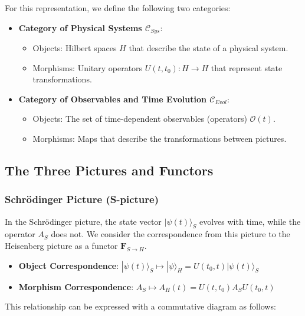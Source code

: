 \documentclass[uplatex,a4j,12pt,dvipdfmx]{jsarticle}
\begin{document}
For this representation, we define the following two categories:

\begin{itemize}
	\item \textbf{Category of Physical Systems $\mathcal{C}_{Sys}$}:
	      \begin{itemize}
		      \item Objects: Hilbert spaces $H$ that describe the state of a physical system.
		      \item Morphisms: Unitary operators $U(t, t_0): H \to H$ that represent state transformations.
	      \end{itemize}

	\item \textbf{Category of Observables and Time Evolution $\mathcal{C}_{Evol}$}:
	      \begin{itemize}
		      \item Objects: The set of time-dependent observables (operators) $\mathcal{O}(t)$.
		      \item Morphisms: Maps that describe the transformations between pictures.
	      \end{itemize}
\end{itemize}

\subsection{The Three Pictures and Functors}

\subsubsection{Schrödinger Picture (S-picture)}

In the Schrödinger picture, the state vector $|\psi(t)\rangle_S$ evolves with time, while the operator $A_S$ does not. We consider the correspondence from this picture to the Heisenberg picture as a functor $\mathbf{F}_{S \to H}$.

\begin{itemize}
	\item \textbf{Object Correspondence}:
	      $|\psi(t)\rangle_S \mapsto |\psi\rangle_H = U(t_0, t)|\psi(t)\rangle_S$
	\item \textbf{Morphism Correspondence}:
	      $A_S \mapsto A_H(t) = U(t, t_0)A_S U(t_0, t)$
\end{itemize}

This relationship can be expressed with a commutative diagram as follows:
\end{document}
